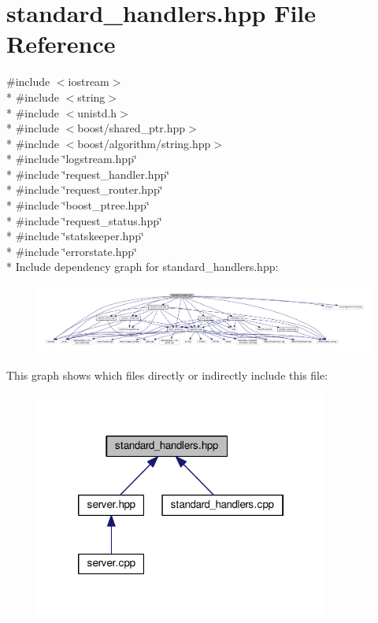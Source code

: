 \hypertarget{a00079}{\section{standard\-\_\-handlers.\-hpp File Reference}
\label{a00079}
}
{\ttfamily \#include $<$iostream$>$}\\*
{\ttfamily \#include $<$string$>$}\\*
{\ttfamily \#include $<$unistd.\-h$>$}\\*
{\ttfamily \#include $<$boost/shared\-\_\-ptr.\-hpp$>$}\\*
{\ttfamily \#include $<$boost/algorithm/string.\-hpp$>$}\\*
{\ttfamily \#include \char`\"{}logstream.\-hpp\char`\"{}}\\*
{\ttfamily \#include \char`\"{}request\-\_\-handler.\-hpp\char`\"{}}\\*
{\ttfamily \#include \char`\"{}request\-\_\-router.\-hpp\char`\"{}}\\*
{\ttfamily \#include \char`\"{}boost\-\_\-ptree.\-hpp\char`\"{}}\\*
{\ttfamily \#include \char`\"{}request\-\_\-status.\-hpp\char`\"{}}\\*
{\ttfamily \#include \char`\"{}statskeeper.\-hpp\char`\"{}}\\*
{\ttfamily \#include \char`\"{}errorstate.\-hpp\char`\"{}}\\*
Include dependency graph for standard\-\_\-handlers.\-hpp\-:\nopagebreak
\begin{figure}[H]
\begin{center}
\leavevmode
\includegraphics[width=350pt]{a00126}
\end{center}
\end{figure}
This graph shows which files directly or indirectly include this file\-:\nopagebreak
\begin{figure}[H]
\begin{center}
\leavevmode
\includegraphics[width=273pt]{a00127}
\end{center}
\end{figure}
